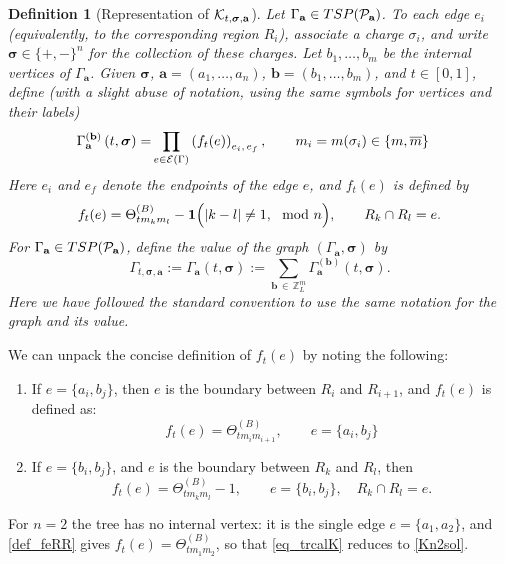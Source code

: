 \documentclass[10pt,reqno]{article}
\renewcommand{\bar}{\overline}
\theoremstyle{plain} %
\newtheorem{definition}[theorem]{Definition}
\theoremstyle{remark}
\numberwithin{equation}{section}
\begin{document}
\begin{definition}[Representation of ${\cal K}_{t, \boldsymbol{\sigma}, \textbf{a}}$]\label{def33} 
Let $\Gamma_{\textbf{a}}\in TSP({\cal P}_{\textbf{a}})$. To each edge $e_i$ (equivalently, to the corresponding region $R_i$), associate a charge $\sigma_i$, and write $\boldsymbol{\sigma}\in\{+,-\}^n$ for the collection of these charges.
Let $b_1,\ldots,b_m$ be the internal vertices of $\Gamma_{\textbf{a}}$. Given $\boldsymbol{\sigma}$, $\textbf{a}=(a_1,\ldots,a_n)$, $\textbf{b}=(b_1,\ldots,b_m)$, and $t\in[0,1]$, define (with a slight abuse of notation, using the same symbols for vertices and their labels)
\begin{align}\label{defGabst}
\Gamma_{\textbf{a}}^{(\textbf{b})}\left( t,\boldsymbol{\sigma}\right)=& 
\prod_{e\in {\cal E} (\Gamma)} \left(f_{ t}(e)\right)_{e_i,\,e_f},\quad \quad m_i=m(\sigma_i)\in \{m, \bar m \}
\end{align}
Here $e_i$ and $e_f$ denote the endpoints of the edge $e$, and
$f_t(e)$ is defined by
\begin{equation}\label{def_feRR}
    f_t(e) =
 \Theta^{(B)}_{t m_k m_{l}}-{\bf 1}\Big(|k  - l|\ne 1,\mod n\Big),\quad  \quad R_k\cap R_l =e .
\end{equation}
For $\Gamma_{\textbf{a}}\in TSP({\cal P}_{\textbf{a}})$, define the value of the graph $(\Gamma_{\textbf{a}},\boldsymbol{\sigma} )$ by 
\begin{equation}\label{def_Gatsiga}
   \Gamma_{t, \boldsymbol{\sigma}, \textbf{a}}
 :=
 \Gamma_{\textbf{a}}(t, \boldsymbol{\sigma})
 := \sum_{\textbf{b}\,\in \,\mathbb Z_L^m} \Gamma^{(\textbf{b})}_{\textbf{a}}(t, \boldsymbol{\sigma}) .
\end{equation}
Here we have followed the standard convention to use the same notation for the graph and its value. 

 



\end{definition}

We can unpack the concise definition 
of $f_t(e)$ by noting the following: 
\begin{enumerate}
    \item If $e=\{a_i, b_j\}$, %
    then $e$ is the boundary between $R_i$ and $R_{i+1}$, and $f_t(e)$ is defined as: 
    $$ 
    f_t(e)= \Theta^{(B)}_{t m_i m_{i+1}},\quad\quad  e=\{a_i, b_j\}
    $$
     \item If $e=\{b_i, b_j\}$, and $e$ is the boundary between   $R_k$ and $R_{l}$, then %
    $$ 
    f_t(e)= \Theta^{(B)}_{t m_k m_{l}}-1,\quad \quad e=\{b_i, b_j\},\quad R_k\cap R_l =e. 
    $$
\end{enumerate}
For $n=2$ the tree has no internal vertex: it is the single edge $e=\{a_1,a_2\}$, and \eqref{def_feRR} gives $f_t(e)=\Theta^{(B)}_{tm_1m_2}$, so that \eqref{eq_trcalK} reduces to \eqref{Kn2sol}.
\end{document}
